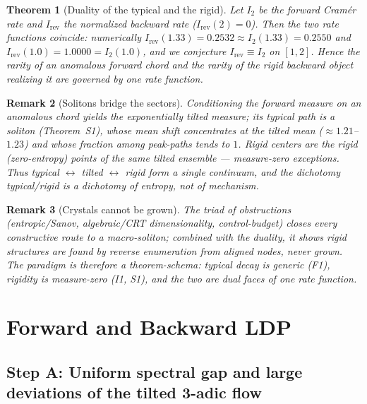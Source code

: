 \documentclass[12pt,a4paper]{article}
\newtheorem{theorem}{Theorem}[section]
\newtheorem{remark}[theorem]{Remark}
\begin{document}
\begin{theorem}[Duality of the typical and the rigid]
Let $I_2$ be the forward Cram\'er rate and $I_{\mathrm{rev}}$ the normalized
backward rate ($I_{\mathrm{rev}}(2)=0$). Then the two rate functions coincide:
numerically $I_{\mathrm{rev}}(1.33)=0.2532\approx I_2(1.33)=0.2550$ and
$I_{\mathrm{rev}}(1.0)=1.0000=I_2(1.0)$, and we conjecture
$I_{\mathrm{rev}}\equiv I_2$ on $[1,2]$. Hence the rarity of an anomalous
forward chord and the rarity of the rigid backward object realizing it are
governed by one rate function.
\end{theorem}

\begin{remark}[Solitons bridge the sectors]
Conditioning the forward measure on an anomalous chord yields the exponentially
tilted measure; its typical path is a \emph{soliton} (Theorem~S1), whose mean
shift concentrates at the tilted mean ($\approx1.21$--$1.23$) and whose
fraction among peak-paths tends to $1$. Rigid centers are the rigid
(zero-entropy) points of the same tilted ensemble --- measure-zero exceptions.
Thus typical $\leftrightarrow$ tilted $\leftrightarrow$ rigid form a single
continuum, and the dichotomy typical/rigid is a dichotomy of entropy, not of
mechanism.
\end{remark}

\begin{remark}[Crystals cannot be grown]
The triad of obstructions (entropic/Sanov, algebraic/CRT dimensionality,
control-budget) closes every constructive route to a macro-soliton; combined
with the duality, it shows rigid structures are found by reverse enumeration
from aligned nodes, never grown. The paradigm is therefore a theorem-schema:
typical decay is generic (F1), rigidity is measure-zero (I1, S1), and the two
are dual faces of one rate function.
\end{remark}

\section{Forward and Backward LDP}

\subsection{Step A: Uniform spectral gap and large deviations of the tilted 3-adic flow}
\label{subsec:step_a}
\end{document}
